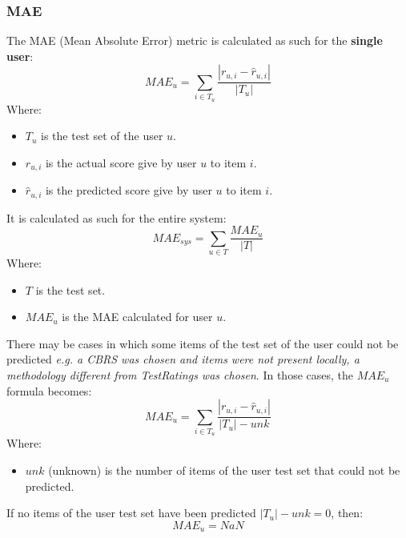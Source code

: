 \subsubsection{MAE}\label{subsubsec:mae}
The MAE (Mean Absolute Error) metric is calculated as such for the \textbf{single user}:
\hfill\break
\hfill\break
    \[
        MAE_u = \sum_{i \in T_u} \frac{|r_{u,i} - \hat{r}_{u,i}|}{|T_u|}
    \]
\hfill\break
\hfill\break
    Where:
\begin{itemize}
    \item $T_u$ is the test set of the user $u$.
    \item $r_{u, i}$ is the actual score give by user $u$ to item $i$.
    \item $\hat{r}_{u, i}$ is the predicted score give by user $u$ to item $i$.
\end{itemize}
\hfill\break
\hfill\break
It is calculated as such for the entire system:
\hfill\break
\hfill\break
    \[
        MAE_{sys} = \sum_{u \in T} \frac{MAE_u}{|T|}
    \]
\hfill\break
\hfill\break
    Where:
\begin{itemize}
    \item $T$ is the test set.
    \item $MAE_u$ is the MAE calculated for user $u$.
\end{itemize}
\hfill\break
\hfill\break
There may be cases in which some items of the test set of the user could not be predicted
\textit{e.g. a CBRS was chosen and items were not present locally, a methodology different from TestRatings was chosen}.
In those cases, the $MAE_u$ formula becomes:
\hfill\break
\hfill\break
    \[
        MAE_u = \sum_{i \in T_u} \frac{|r_{u,i} - \hat{r}_{u,i}|}{|T_u| - unk}
    \]
\hfill\break
\hfill\break
    Where:
\begin{itemize}
    \item $unk$ (unknown) is the number of items of the user test set that could not be predicted.
\end{itemize}
\hfill\break
\hfill\break
If no items of the user test set have been predicted $|T_u| - unk = 0$, then:
\hfill\break
\hfill\break
    \[
        MAE_u = NaN
    \]
\hfill\break
\hfill\break

